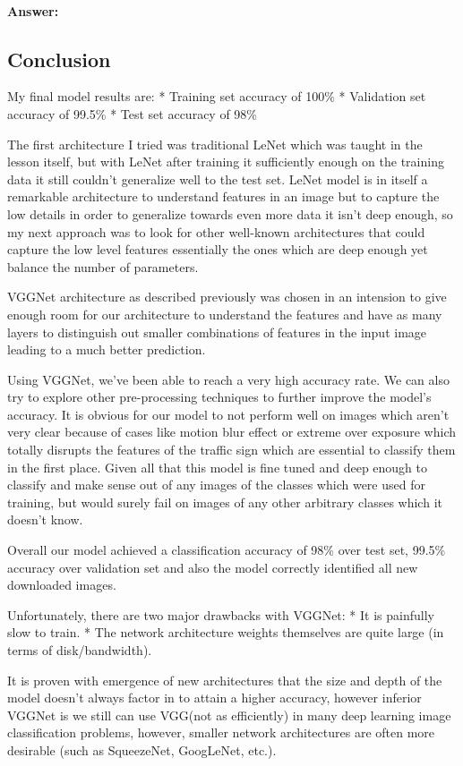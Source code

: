 \documentclass[11pt]{article}
\begin{document}
    \paragraph{Answer:}\label{answer}

    \subsection{Conclusion}\label{conclusion}

My final model results are: * Training set accuracy of 100\% *
Validation set accuracy of 99.5\% * Test set accuracy of 98\%

The first architecture I tried was traditional LeNet which was taught in
the lesson itself, but with LeNet after training it sufficiently enough
on the training data it still couldn't generalize well to the test set.
LeNet model is in itself a remarkable architecture to understand
features in an image but to capture the low details in order to
generalize towards even more data it isn't deep enough, so my next
approach was to look for other well-known architectures that could
capture the low level features essentially the ones which are deep
enough yet balance the number of parameters.

VGGNet architecture as described previously was chosen in an intension
to give enough room for our architecture to understand the features and
have as many layers to distinguish out smaller combinations of features
in the input image leading to a much better prediction.

Using VGGNet, we've been able to reach a very high accuracy rate. We can
also try to explore other pre-processing techniques to further improve
the model's accuracy. It is obvious for our model to not perform well on
images which aren't very clear because of cases like motion blur effect
or extreme over exposure which totally disrupts the features of the
traffic sign which are essential to classify them in the first place.
Given all that this model is fine tuned and deep enough to classify and
make sense out of any images of the classes which were used for
training, but would surely fail on images of any other arbitrary classes
which it doesn't know.

Overall our model achieved a classification accuracy of 98\% over test
set, 99.5\% accuracy over validation set and also the model correctly
identified all new downloaded images.

Unfortunately, there are two major drawbacks with VGGNet: * It is
painfully slow to train. * The network architecture weights themselves
are quite large (in terms of disk/bandwidth).

It is proven with emergence of new architectures that the size and depth
of the model doesn't always factor in to attain a higher accuracy,
however inferior VGGNet is we still can use VGG(not as efficiently) in
many deep learning image classification problems, however, smaller
network architectures are often more desirable (such as SqueezeNet,
GoogLeNet, etc.).


    
    
    
    
\end{document}
